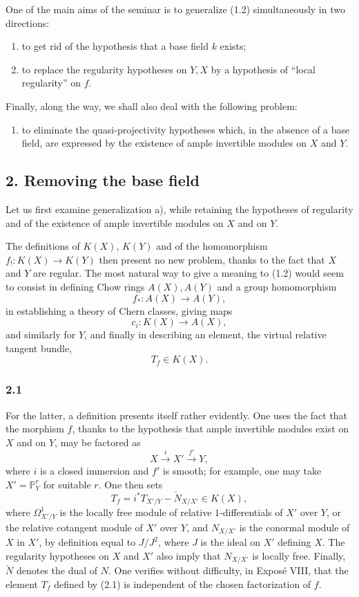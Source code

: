 One of the main aims of the seminar is to generalize (1.2) simultaneously in two directions:
\begin{enumerate}[label=\alph*)]
\item to get rid of the hypothesis that a base field $k$ exists;
\item to replace the regularity hypotheses on $Y,X$ by a hypothesis of ``local regularity'' on $f$.
\end{enumerate}
Finally, along the way, we shall also deal with the following problem:
\begin{enumerate}[label=\alph*),start=3]
\item to eliminate the quasi-projectivity hypotheses which, in the absence of a base field, are expressed by the existence of ample invertible modules on $X$ and $Y$.
\end{enumerate}

\subsection*{2. Removing the base field}
Let us first examine generalization a), while retaining the hypotheses of regularity and of the existence of ample invertible modules on $X$ and on $Y$.

The definitions of $K(X)$, $K(Y)$ and of the homomorphism $f_!:K(X)\to K(Y)$ then present no new problem, thanks to the fact that $X$ and $Y$ are regular. The most natural way to give a meaning to (1.2) would seem to consist in defining Chow rings $A(X),A(Y)$ and a group homomorphism
\[
f_*:A(X)\longrightarrow A(Y),
\]
in establishing a theory of Chern classes, giving maps
\[
c_i:K(X)\longrightarrow A(X),
\]
and similarly for $Y$, and finally in describing an element, the virtual relative tangent bundle,
\[
T_f\in K(X).
\]

\subsubsection*{2.1}
For the latter, a definition presents itself rather evidently. One uses the fact that the morphism $f$, thanks to the hypothesis that ample invertible modules exist on $X$ and on $Y$, may be factored as
\[
X\xrightarrow{i}X'\xrightarrow{f'}Y,
\]
where $i$ is a closed immersion and $f'$ is smooth; for example, one may take $X'=\mathbb P^r_Y$ for suitable $r$. One then sets
\begin{equation}\tag{2.1}
T_f=i^*T_{X'/Y}-\check N_{X/X'}\in K(X),
\end{equation}
where $\Omega^1_{X'/Y}$ is the locally free module of relative $1$-differentials of $X'$ over $Y$, or the relative cotangent module of $X'$ over $Y$, and $N_{X/X'}$ is the conormal module of $X$ in $X'$, by definition equal to $J/J^2$, where $J$ is the ideal on $X'$ defining $X$. The regularity hypotheses on $X$ and $X'$ also imply that $N_{X/X'}$ is locally free. Finally, $\check N$ denotes the dual of $N$. One verifies without difficulty, in Exposé VIII, that the element $T_f$ defined by (2.1) is independent of the chosen factorization of $f$.

